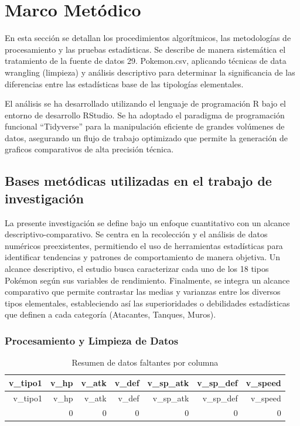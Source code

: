 \documentclass[oneside,11pt]{Latex/Classes/PhDthesisPSnPDF}
\begin{document}
\chapter{Marco Metódico}

En esta sección se detallan los procedimientos algorítmicos, las
metodologías de procesamiento y las pruebas estadísticas. Se describe de
manera sistemática el tratamiento de la fuente de datos 29. Pokemon.csv,
aplicando técnicas de data wrangling (limpieza) y análisis descriptivo
para determinar la significancia de las diferencias entre las
estadísticas base de las tipologías elementales.

El análisis se ha desarrollado utilizando el lenguaje de programación R
bajo el entorno de desarrollo RStudio. Se ha adoptado el paradigma de
programación funcional ``Tidyverse'' para la manipulación eficiente de
grandes volúmenes de datos, asegurando un flujo de trabajo optimizado
que permite la generación de graficos comparativos de alta precisión
técnica.

\section{Bases metódicas utilizadas en el trabajo de investigación}

La presente investigación se define bajo un enfoque cuantitativo con un
alcance descriptivo-comparativo. Se centra en la recolección y el
análisis de datos numéricos preexistentes, permitiendo el uso de
herramientas estadísticas para identificar tendencias y patrones de
comportamiento de manera objetiva. Un alcance descriptivo, el estudio
busca caracterizar cada uno de los 18 tipos Pokémon según sus variables
de rendimiento. Finalmente, se integra un alcance comparativo que
permite contrastar las medias y varianzas entre los diversos tipos
elementales, estableciendo así las superioridades o debilidades
estadísticas que definen a cada categoría (Atacantes, Tanques, Muros).\\

\newpage
\subsection{Procesamiento y Limpieza de Datos}

\begin{longtable}[]{@{}rrrrrrr@{}}
\caption{Resumen de datos faltantes por columna}\tabularnewline
\toprule\noalign{}
v\_tipo1 & v\_hp & v\_atk & v\_def & v\_sp\_atk & v\_sp\_def &
v\_speed \\
\midrule\noalign{}
\endfirsthead
\toprule\noalign{}
v\_tipo1 & v\_hp & v\_atk & v\_def & v\_sp\_atk & v\_sp\_def &
v\_speed \\
\midrule\noalign{}
\endhead
\bottomrule\noalign{}
\endlastfoot
0 & 0 & 0 & 0 & 0 & 0 & 0 \\
\end{longtable}
\end{document}
